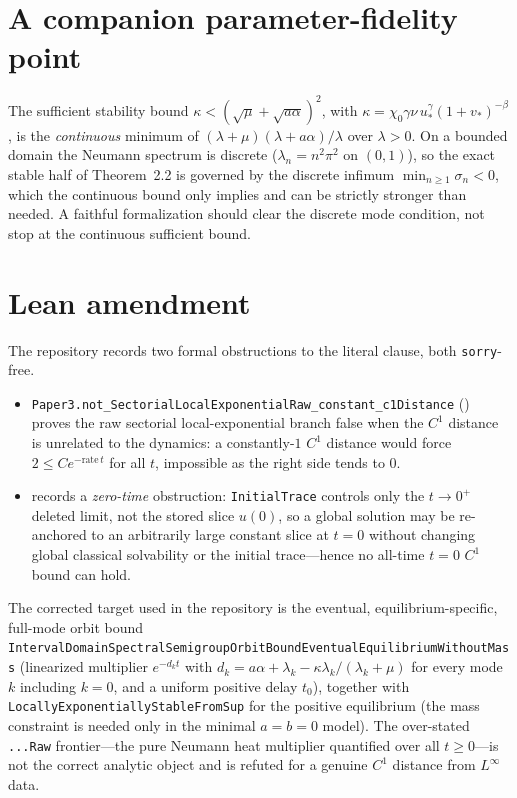 \documentclass[11pt]{article}
\begin{document}
\section{A companion parameter-fidelity point}

The sufficient stability bound $\kappa<(\sqrt{\mu}+\sqrt{a\alpha})^{2}$, with
$\kappa=\chi_{0}\gamma\nu\,u_{*}^{\gamma}(1+v_{*})^{-\beta}$, is the
\emph{continuous} minimum of $(\lambda+\mu)(\lambda+a\alpha)/\lambda$ over
$\lambda>0$.  On a bounded domain the Neumann spectrum is discrete
($\lambda_{n}=n^{2}\pi^{2}$ on $(0,1)$), so the exact stable half of
Theorem~2.2 is governed by the discrete infimum
$\min_{n\ge 1}\sigma_{n}<0$, which the continuous bound only implies and can be
strictly stronger than needed.  A faithful formalization should clear the
discrete mode condition, not stop at the continuous sufficient bound.

\section{Lean amendment}

The repository records two formal obstructions to the literal clause, both
\texttt{sorry}-free.
\begin{itemize}
\item \texttt{Paper3.not\_SectorialLocalExponentialRaw\_constant\_c1Distance}
  () proves the raw sectorial
  local-exponential branch false when the $C^{1}$ distance is unrelated to the
  dynamics: a constantly-$1$ $C^{1}$ distance would force $2\le C e^{-\text{rate}\,t}$
  for all $t$, impossible as the right side tends to $0$.
\item {}
  records a \emph{zero-time} obstruction: \texttt{InitialTrace} controls only the
  $t\to 0^{+}$ deleted limit, not the stored slice $u(0)$, so a global solution
  may be re-anchored to an arbitrarily large constant slice at $t=0$ without
  changing global classical solvability or the initial trace---hence no all-time
  $t=0$ $C^{1}$ bound can hold.
\end{itemize}
The corrected target used in the repository is the eventual, equilibrium-specific,
full-mode orbit bound
\texttt{IntervalDomainSpectralSemigroupOrbitBoundEventualEquilibriumWithoutMass}
(linearized multiplier $e^{-d_{k}t}$ with
$d_{k}=a\alpha+\lambda_{k}-\kappa\lambda_{k}/(\lambda_{k}+\mu)$ for every mode
$k$ including $k=0$, and a uniform positive delay $t_{0}$), together with
\texttt{LocallyExponentiallyStableFromSup} for the positive equilibrium (the mass
constraint is needed only in the minimal $a=b=0$ model).  The over-stated
\texttt{...Raw} frontier---the pure Neumann heat multiplier quantified over all
$t\ge 0$---is not the correct analytic object and is refuted for a genuine
$C^{1}$ distance from $L^{\infty}$ data.
\end{document}

